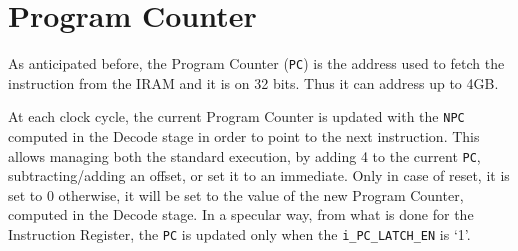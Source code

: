 \section{Program Counter}
As anticipated before, the Program Counter (\texttt{PC}) is the address used to fetch the instruction from the IRAM and it is on 32 bits. Thus it can address up to 4GB.

At each clock cycle, the current Program Counter is updated with the \texttt{NPC} computed in the Decode stage in order to point to the next instruction. This allows managing both the standard execution, by adding 4 to the current \texttt{PC}, subtracting/adding an offset, or set it to an immediate. Only in case of reset, it is set to 0 otherwise, it will be set to the value of the new Program Counter, computed in the Decode stage. In a specular way, from what is done for the Instruction Register, the \texttt{PC} is updated only when the \texttt{i\_PC\_LATCH\_EN} is `1'.

